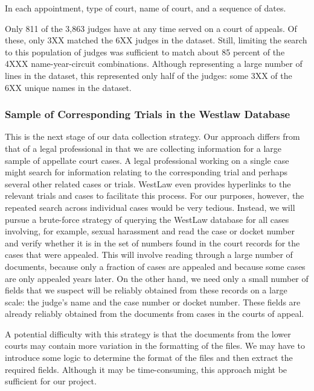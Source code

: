 \documentclass[11pt]{paper}
\begin{document}
In each appointment, type of court, name of court, and a sequence of dates.



Only 811 of the 3,863 judges have at any time served on a court of appeals. 
Of these, only 3XX matched the 6XX judges in the dataset. 
Still, limiting the search to this population of judges was sufficient to match 
about 85 percent of the 4XXX name-year-circuit combinations. 
Although representing a large number of lines in the dataset, 
this represented only half of the judges: some 3XX of the 6XX
unique names in the dataset. 


\subsubsection{Sample of Corresponding Trials 
	in the Westlaw Database}

This is the next stage of our data collection strategy. 
Our approach differs from that of a legal professional in that
we are collecting information for a large sample of appellate court cases.  
A legal professional working on a single case might search for information relating to the corresponding trial and perhaps several other related cases or trials. 
WestLaw even provides hyperlinks to the relevant trials and cases to facilitate this process. 
For our purposes, however, the repeated search across individual cases would be very tedious. 
Instead, we will pursue a brute-force strategy of querying the WestLaw database for all cases involving, for example, sexual harassment
and read the case or docket number and verify whether it is in the set of numbers found in the court records for the cases that were appealed. 
This will involve reading through a large number of documents, 
because only a fraction of cases are appealed 
and because some cases are only appealed years later. 
On the other hand, we need only a small number of fields that
we suspect will be reliably obtained from these records on a large scale:
the judge's name and the case number or docket number. 
These fields are already reliably obtained from the documents from cases in the courts of appeal. 

A potential difficulty with this strategy is that
the documents from the lower courts may contain more variation
in the formatting of the files. 
We may have to introduce some logic to determine the format of the files
and then extract the required fields. 
Although it may be time-consuming, this approach might be sufficient
for our project. 
\end{document}
